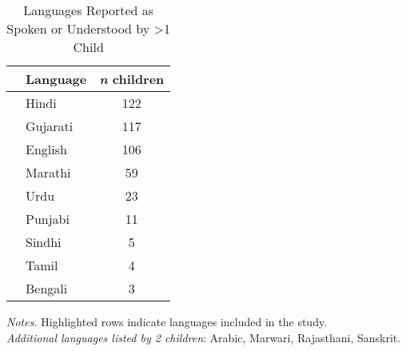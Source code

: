 \begin{table}[t]
\caption{Languages Reported as Spoken or Understood by \textgreater1 Child}\label{tab:child-langs}
\centering
\begin{threeparttable}
\begin{tabular}{p{.2cm}p{2.5cm}c}
\toprule
&\textbf{Language} & \bfseries\textit{n} children\\
\midrule
\rowcolor{lightergreen}&Hindi & 122 \\ 
\rowcolor{lightergreen}&Gujarati & 117 \\ 
\rowcolor{lightergreen}&English & 106 \\ 
\rowcolor{lightergreen}&Marathi &  59 \\ 
\rowcolor{lightergreen}&Urdu &  23 \\ 
&Punjabi &  11 \\ 
&Sindhi &   5 \\ 
\rowcolor{lightergreen}&Tamil &   4 \\ 
&Bengali &   3 \\ 
\bottomrule
\end{tabular}

\begin{tablenotes}
\small
\vspace{5pt}
      \item\textit{Notes.} {Highlighted rows indicate languages included in the study.}\\ 
      \textit{Additional languages listed by 2 children}: Arabic, Marwari, Rajasthani, Sanskrit.\\
    \end{tablenotes}
  \end{threeparttable}
\end{table}
